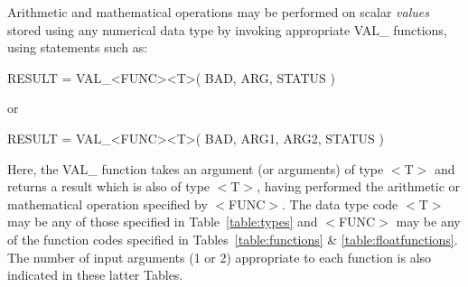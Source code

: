\documentclass[11pt,nolof]{starlink}
\providecommand{\name}[1]{#1}
\begin{document}
Arithmetic and mathematical operations may be performed on scalar \emph{values} stored using any numerical data type by invoking appropriate
\name{VAL\_} functions, using statements such as:

\begin{terminalv}
RESULT = VAL_<FUNC><T>( BAD, ARG, STATUS )
\end{terminalv}
or
\begin{terminalv}
RESULT = VAL_<FUNC><T>( BAD, ARG1, ARG2, STATUS )
\end{terminalv}

Here, the \name{VAL\_} function takes an argument (or arguments) of type
\name{$<$T$>$} and returns a result which is also of type \name{$<$T$>$},
having performed the arithmetic or mathematical operation specified by
\name{$<$FUNC$>$}.
The data type code \name{$<$T$>$} may be any of those specified in
Table~\ref{table:types} and \name{$<$FUNC$>$} may be any of the function
codes specified in Tables~\ref{table:functions} \&
\ref{table:floatfunctions}.
The number of input arguments (1 or 2) appropriate to each function is also
indicated in these latter Tables.
\end{document}
